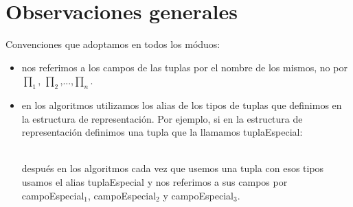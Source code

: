 \section{Observaciones generales}

Convenciones que adoptamos en todos los móduos:
\begin{itemize}
	\item nos referimos a los campos de las tuplas por el nombre de los mismos, no por $\prod_1$, $\prod_2$,...,$\prod_n$.
    \item en los algoritmos utilizamos los alias de los tipos de tuplas que definimos en la estructura de representación. Por ejemplo, si en la estructura de representación definimos una tupla que la llamamos tuplaEspecial:\\
    \begin{Tupla}[tuplaEspecial]
    \end{Tupla}\\ 
después en los algoritmos cada vez que usemos una tupla con esos tipos usamos el alias tuplaEspecial y nos referimos a sus campos por campoEspecial$_1$, campoEspecial$_2$ y campoEspecial$_3$.
\end{itemize}

